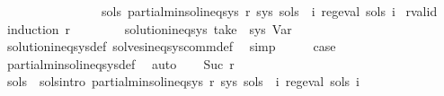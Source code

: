 \begin{isabellebody}
\ \ \ \ \ \ \ \ \ \ \ \ \ \ \ \ {\isachardoublequoteopen}{\isasymexists}sols{\isachardot}{\kern0pt}\ partial{\isacharunderscore}{\kern0pt}min{\isacharunderscore}{\kern0pt}sol{\isacharunderscore}{\kern0pt}ineq{\isacharunderscore}{\kern0pt}sys\ r\ sys\ sols\ {\isasymand}\ {\isacharparenleft}{\kern0pt}{\isasymforall}i{\isachardot}{\kern0pt}\ reg{\isacharunderscore}{\kern0pt}eval\ {\isacharparenleft}{\kern0pt}sols\ i{\isacharparenright}{\kern0pt}{\isacharparenright}{\kern0pt}{\isachardoublequoteclose}\isanewline
%
\isadelimproof
%
\endisadelimproof
%
\isatagproof
{}\isamarkupfalse%
\ r{\isacharunderscore}{\kern0pt}valid\ \isamarkupfalse%
\ {\isacharparenleft}{\kern0pt}induction\ r{\isacharparenright}{\kern0pt}\isanewline
\ \ \isamarkupfalse%
\ {}\isanewline
\ \ \isamarkupfalse%
\ {\isachardoublequoteopen}solution{\isacharunderscore}{\kern0pt}ineq{\isacharunderscore}{\kern0pt}sys\ {\isacharparenleft}{\kern0pt}take\ {}\ sys{\isacharparenright}{\kern0pt}\ Var{\isachardoublequoteclose}\isanewline
\ \ \ \ \isamarkupfalse%
\ solution{\isacharunderscore}{\kern0pt}ineq{\isacharunderscore}{\kern0pt}sys{\isacharunderscore}{\kern0pt}def\ solves{\isacharunderscore}{\kern0pt}ineq{\isacharunderscore}{\kern0pt}sys{\isacharunderscore}{\kern0pt}comm{\isacharunderscore}{\kern0pt}def\ \isamarkupfalse%
\ simp\isanewline
\ \ \isamarkupfalse%
\ \isamarkupfalse%
\ {\isacharquery}{\kern0pt}case\ \isamarkupfalse%
\ partial{\isacharunderscore}{\kern0pt}min{\isacharunderscore}{\kern0pt}sol{\isacharunderscore}{\kern0pt}ineq{\isacharunderscore}{\kern0pt}sys{\isacharunderscore}{\kern0pt}def\ \isamarkupfalse%
\ auto\isanewline
{}\isamarkupfalse%
\isanewline
\ \ \isamarkupfalse%
\ {\isacharparenleft}{\kern0pt}Suc\ r{\isacharparenright}{\kern0pt}\isanewline
\ \ \isamarkupfalse%
\ \isamarkupfalse%
\ sols\ \ sols{\isacharunderscore}{\kern0pt}intro{\isacharcolon}{\kern0pt}\ {\isachardoublequoteopen}partial{\isacharunderscore}{\kern0pt}min{\isacharunderscore}{\kern0pt}sol{\isacharunderscore}{\kern0pt}ineq{\isacharunderscore}{\kern0pt}sys\ r\ sys\ sols\ {\isasymand}\ {\isacharparenleft}{\kern0pt}{\isasymforall}i{\isachardot}{\kern0pt}\ reg{\isacharunderscore}{\kern0pt}eval\ {\isacharparenleft}{\kern0pt}sols\ i{\isacharparenright}{\kern0pt}{\isacharparenright}{\kern0pt}{\isachardoublequoteclose}\isanewline

\end{isabellebody}
